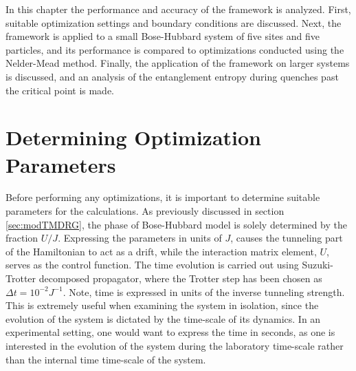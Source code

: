 In this chapter the performance and accuracy of the framework is analyzed. First, suitable optimization settings and boundary conditions are discussed.
Next, the framework is applied to a small Bose-Hubbard system of five sites and five particles, and its performance is compared to optimizations conducted using the Nelder-Mead method.
Finally, the application of the framework on larger systems is discussed, and an analysis of the entanglement entropy during quenches past the critical point is made. 


\section{Determining Optimization Parameters}
Before performing any optimizations, it is important to determine suitable parameters for the calculations.
As previously discussed in section \ref{sec:modTMDRG}, the phase of Bose-Hubbard model is solely determined by the fraction $U/J$. Expressing the parameters in units of $J$, causes the tunneling part of the Hamiltonian to act as a drift, while the interaction matrix element, $U$, serves as the control function.
The time evolution is carried out using Suzuki-Trotter decomposed propagator, where the Trotter step has been chosen as $\Delta t = 10^{-2} J^{-1}$. Note, time is expressed in units of the inverse tunneling strength. This is extremely useful when examining the system in isolation, since the evolution of the system is dictated by the time-scale of its dynamics. In an experimental setting, one would want to express the time in seconds, as one is interested in the evolution of the system during the laboratory time-scale rather than the internal time time-scale of the system.

